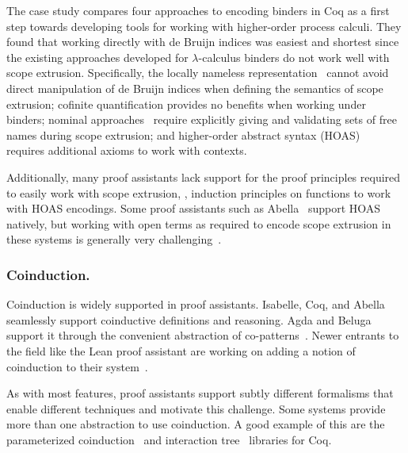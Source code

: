 \documentclass[runningheads]{llncs}
\begin{document}
The case study \cite{AmbalLS21} compares four approaches to encoding binders in Coq as a first step towards developing tools for working with higher-order process calculi.
They found that working directly with de Bruijn indices was easiest and shortest since the existing approaches developed for $\lambda$-calculus binders do not work well with scope extrusion.
Specifically, the locally nameless representation~\cite{Chargueraud2012} cannot avoid direct manipulation of de Bruijn indices when defining the semantics of scope extrusion; cofinite quantification provides no benefits when working under binders; nominal approaches~\cite{Pitts2003} require explicitly giving and validating sets of free names during scope extrusion; and higher-order abstract syntax (HOAS)~\cite{Pfenning1988} requires additional axioms to work with contexts.


Additionally, many proof assistants lack support for the proof principles required to easily work with scope extrusion, \ie, induction principles on functions to work with HOAS encodings.
Some proof assistants such as Abella~\cite{Baelde2014} support HOAS natively, but working with open terms as required to encode scope extrusion in these systems is generally very challenging~\cite{Momigliano2012}.

\subsubsection{Coinduction.}
Coinduction is widely supported in proof assistants.
Isabelle, Coq, and Abella seamlessly support coinductive definitions and reasoning.
Agda and Beluga support it through the convenient abstraction of co-patterns~\cite{Abel2013}.
Newer entrants to the field like the Lean proof assistant are working on adding a notion of coinduction to their system~\cite{Avigad2019,Keizer2023}.

As with most features, proof assistants support subtly different formalisms that enable different techniques and motivate this challenge.
Some systems provide more than one abstraction to use coinduction.
A good example of this are the parameterized coinduction~\cite{Hur2013} and interaction tree~\cite{Xia2019} libraries for Coq.

\end{document}
